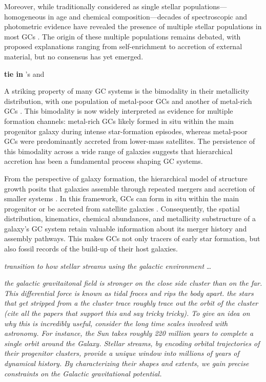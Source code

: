     Moreover, while traditionally considered as single stellar populations—homogeneous in age and chemical composition—decades of spectroscopic and photometric evidence have revealed the presence of multiple stellar populations in most GCs \citep{2008MNRAS.391..825D,2012A&ARv..20...50G,2018ARA&A..56...83B}. The origin of these multiple populations remains debated, with proposed explanations ranging from self-enrichment to accretion of external material, but no consensus has yet emerged.

    \textbf{tie in } \citet{2025arXiv250116438K}'s and \citet{2018RSPSA.47470616F}


    A striking property of many GC systems is the bimodality in their metallicity distribution, with one population of metal-poor GCs and another of metal-rich GCs \citep[e.g.,][]{2006ARA&A..44..193B, 2015ApJ...806...36H}. This bimodality is now widely interpreted as evidence for multiple formation channels: metal-rich GCs likely formed in situ within the main progenitor galaxy during intense star-formation episodes, whereas metal-poor GCs were predominantly accreted from lower-mass satellites. The persistence of this bimodality across a wide range of galaxies suggests that hierarchical accretion has been a fundamental process shaping GC systems.

    From the perspective of galaxy formation, the hierarchical model of structure growth posits that galaxies assemble through repeated mergers and accretion of smaller systems \citep{2015ARA&A..53...51S}. In this framework, GCs can form in situ within the main progenitor or be accreted from satellite galaxies \citep[e.g.,][]{2018MNRAS.479.4760F,2020MNRAS.498.2472K,2023A&A...673A..86P,2024MNRAS.528.3198B,2025A&A...693A.155P}. Consequently, the spatial distribution, kinematics, chemical abundances, and metallicity substructure of a galaxy's GC system retain valuable information about its merger history and assembly pathways. This makes GCs not only tracers of early star formation, but also fossil records of the build-up of their host galaxies.
    
    
    \textit{transition to how stellar streams using the galactic environment }\dots

    \textit{the galactic gravitaitonal field is stronger on the close side cluster than on the far. This differential force is known as tidal froces and rips the body apart. the stars that get stripped from a the cluster trace roughly trace out the orbit of the cluster (cite all the papers that support this and say tricky tricky). To give an idea on why this is incredibly useful, consider the long time scales involved with astronomy. For instance, the Sun takes roughly 220 million years to complete a single orbit around the Galaxy. Stellar streams, by encoding orbital trajectories of their progenitor clusters, provide a unique window into millions of years of dynamical history. By characterizing their shapes and extents, we gain precise constraints on the Galactic gravitational potential.}


